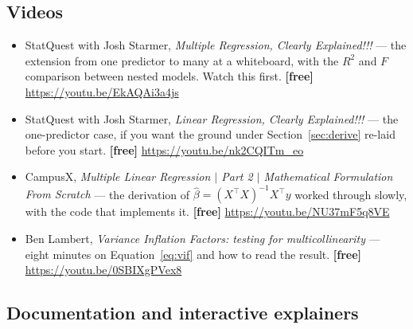 \documentclass[11pt]{article}
\newcommand{\Xt}{X^{\!\top}}
\begin{document}
\subsection*{Videos}

\begin{itemize}[leftmargin=*]
  \item StatQuest with Josh Starmer, \emph{Multiple Regression, Clearly
    Explained!!!} --- the extension from one predictor to many at a
    whiteboard, with the $R^2$ and $F$ comparison between nested models.
    Watch this first. \textbf{[free]} \url{https://youtu.be/EkAQAi3a4js}
  \item StatQuest with Josh Starmer, \emph{Linear Regression, Clearly
    Explained!!!} --- the one-predictor case, if you want the ground under
    Section~\ref{sec:derive} re-laid before you start. \textbf{[free]}
    \url{https://youtu.be/nk2CQITm_eo}
  \item CampusX, \emph{Multiple Linear Regression $\vert$ Part 2 $\vert$
    Mathematical Formulation From Scratch} --- the derivation of
    $\hat\beta = (\Xt X)^{-1}\Xt y$ worked through slowly, with the code that
    implements it. \textbf{[free]} \url{https://youtu.be/NU37mF5q8VE}
  \item Ben Lambert, \emph{Variance Inflation Factors: testing for
    multicollinearity} --- eight minutes on Equation~\eqref{eq:vif} and how
    to read the result. \textbf{[free]} \url{https://youtu.be/0SBIXgPVex8}
\end{itemize}

\subsection*{Documentation and interactive explainers}
\end{document}
